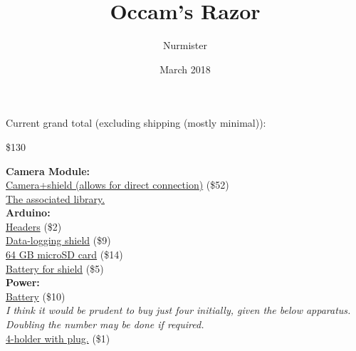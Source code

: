 \documentclass{article}
\title{Occam's Razor}
\author{Nurmister}
\date{March 2018}
\begin{document}
\maketitle

Current grand total (excluding shipping (mostly minimal)):
\begin{center} \$130
\\ \end{center}

\hspace*{-5mm}\textbf{Camera Module:}
\\
\hspace*{10mm}\href{https://www.ebay.com/itm/5MP-OV5642-Sensor-Arducam-Mini-Camera-Shield-
	JPEG-output-for-Arduino-Mega2560/252231270336?epid=703197230\&hash=item3aba27bfc0:g:YjcAAOSwZ1lWg24q}
{Camera+shield (allows for direct connection)} (\$52)
\\
\hspace*{20mm}\href{https://github.com/ArduCAM/Arduino}{The associated library.}
\\
\textbf{Arduino:}
\\
\hspace*{10mm}\href{https://www.sgbotic.com/index.php?dispatch=products.view\&product\_id=1176}{Headers}
 (\$2) \\
\hspace*{10mm}\href{https://goo.gl/yQebem}{Data-logging shield} (\$9)
\\
\hspace*{20mm}\href{https://www.lazada.sg/products/64gb128gb256gb512gb-class-10-micro-memory-sd-card-with-adaptor-red-intl-i142237635-s174867244.html}{64
 GB microSD card} (\$14) \\
\hspace*{20mm}\href{https://www.lazada.sg/products/sony-lithium-cell-cr1220-3v-button-battery-2-pieces-i149268393-s184886719.html?spm=a2o42.searchlist.list.10.15b56b8eUZ6PbG&search=1}{Battery
 for shield} (\$5)
\\
\textbf{Power:}
\\
\hspace*{10mm}\href{https://www.sgbotic.com/index.php?dispatch=products.view\&product_id=2570}{Battery}
 (\$10)
 \\
\hspace*{10mm}\textit{I think it would be prudent to buy just four initially, given the below 
\hspace*{10mm}apparatus. Doubling the number may be done if required.}
\\
\hspace*{10mm}\href{https://www.aliexpress.com/item/New-Power-bank-18650-Battery-Holder-Plastic-Battery-Holder-Storage-Box-Case-for-4x18650-With-DC5/32833164686.html?spm=2114.search0302.3.17.254c7cb1F9rrID&ws_ab_test=searchweb0_0,searchweb201602_0_10152_10151_10811_10618_10059_10696_10534_10313_10084_100031_10083_10624_10546_10623_10307_10548_10341_10065_10340_10068_10343_10342_10103_10620_10344_10325_10622_10621,searchweb201603_0,ppcSwitch_0&algo_pvid=e57ac141-9286-468d-ab3d-bf11f0135ae1&algo_expid=e57ac141-9286-468d-ab3d-bf11f0135ae1-2}{4-holder
 with plug.} (\$1)
\end{document}
